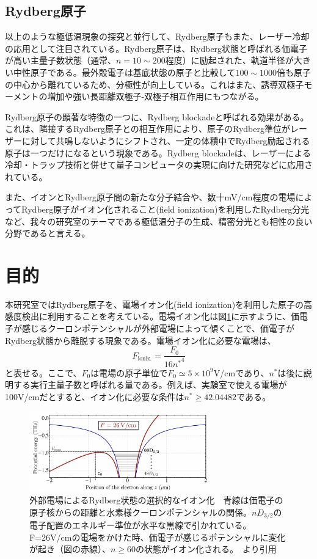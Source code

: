 \documentclass[dvipdfmx]{jsreport}
\begin{document}
\subsection{Rydberg原子}
以上のような極低温現象の探究と並行して、Rydberg原子もまた、レーザー冷却の応用として注目されている。Rydberg原子は、Rydberg状態と呼ばれる価電子が高い主量子数状態（通常、$n=10\sim200$程度）に励起された、軌道半径が大きい中性原子である。最外殻電子は基底状態の原子と比較して$100\sim1000$倍も原子の中心から離れているため、分極性が向上している\cite{rydberg}。これはまた、誘導双極子モーメントの増加や強い長距離双極子-双極子相互作用にもつながる。

Rydberg原子の顕著な特徴の一つに、Rydberg blockadeと呼ばれる効果がある。これは、隣接するRydberg原子との相互作用により、原子のRydberg準位がレーザーに対して共鳴しないようにシフトされ、一定の体積中でRydberg励起される原子は一つだけになるという現象である。Rydberg blockadeは、レーザーによる冷却・トラップ技術と併せて量子コンピュータの実現に向けた研究などに応用されている。\cite{yuma}

また、イオンとRydberg原子間の新たな分子結合\cite{ion-rydberg}や、数十mV/cm程度の電場によってRydberg原子がイオン化されること(field ionization)を利用したRydberg分光\cite{yuma}など、我々の研究室のテーマである極低温分子の生成、精密分光とも相性の良い分野であると言える。
\section{目的}
本研究室ではRydberg原子を、電場イオン化(field ionization)を利用した原子の高感度検出に利用することを考えている。電場イオン化は図\ref{fig:ionize}に示すように、価電子が感じるクーロンポテンシャルが外部電場によって傾くことで、価電子がRydberg状態から離脱する現象である。電場イオン化に必要な電場は、
\begin{equation}
    F_{\text{ioniz.}} = \frac{F_0}{16 {n^*}^4}
\end{equation}
と表せる。\cite{rucas}ここで、$F_0$は電場の原子単位で$F_0 \simeq 5 \times 10^9$V/cmであり、$n^*$は後に説明する実行主量子数と呼ばれる量である。例えば、実験室で使える電場が100V/cmだとすると、イオン化に必要な条件は$n^* \geq 42.04482$である。
\begin{figure}[hbtp]
\centering
\includegraphics[width=0.7\textwidth]{images/ionize.png}
\caption{\label{fig:ionize}外部電場によるRydberg状態の選択的なイオン化　青線は価電子の原子核からの距離と水素様クーロンポテンシャルの関係。$nD_{3/2}$の電子配置のエネルギー準位が水平な黒線で引かれている。F=26V/cmの電場をかけた時、価電子が感じるポテンシャルに変化が起き（図の赤線）、$n \geq 60$の状態がイオン化される。　\cite{rucas}より引用}
\end{figure}
\end{document}
